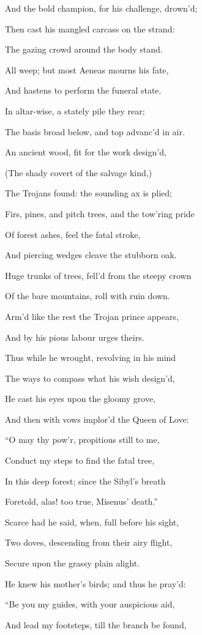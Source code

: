 And the bold champion, for his challenge, drown’d;

Then cast his mangled carcass on the strand:

The gazing crowd around the body stand.

All weep; but most Aeneas mourns his fate,

And hastens to perform the funeral state.

In altar-wise, a stately pile they rear;

The basis broad below, and top advanc’d in air.

An ancient wood, fit for the work design’d,

(The shady covert of the salvage kind,)

The Trojans found: the sounding ax is plied;

Firs, pines, and pitch trees, and the tow’ring pride

Of forest ashes, feel the fatal stroke,

And piercing wedges cleave the stubborn oak.

Huge trunks of trees, fell’d from the steepy crown

Of the bare mountains, roll with ruin down.

Arm’d like the rest the Trojan prince appears,

And by his pious labour urges theirs.

Thus while he wrought, revolving in his mind

The ways to compass what his wish design’d,

He cast his eyes upon the gloomy grove,

And then with vows implor’d the Queen of Love:

“O may thy pow’r, propitious still to me,

Conduct my steps to find the fatal tree,

In this deep forest; since the Sibyl’s breath

Foretold, alas! too true, Misenus’ death.”

Scarce had he said, when, full before his sight,

Two doves, descending from their airy flight,

Secure upon the grassy plain alight.

He knew his mother’s birds; and thus he pray’d:

“Be you my guides, with your auspicious aid,

And lead my footsteps, till the branch be found,

